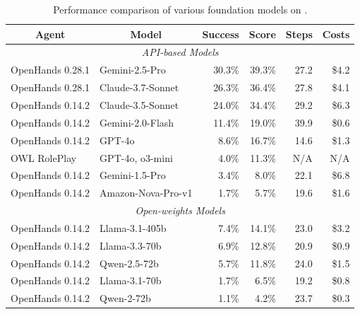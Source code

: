 \documentclass{article}
\begin{document}
\begin{table}
\centering
\scriptsize
\vspace{-6mm}
\caption{Performance comparison of various foundation models on \tac.}
\label{tab:main_table}
\vspace{-1mm}
\begin{tabular}{l|l|rrrr}
\toprule
\multicolumn{1}{c|}{\bf Agent} & \multicolumn{1}{c|}{\bf Model} & \textbf{Success} & \textbf{Score} & \textbf{Steps} & \textbf{Costs} \\
\midrule
\multicolumn{6}{c}{\textit{API-based Models}} \\
\midrule
OpenHands 0.28.1 & Gemini-2.5-Pro & 30.3\% & 39.3\% & 27.2 & \$4.2 \\
OpenHands 0.28.1 & Claude-3.7-Sonnet & 26.3\% & 36.4\% & 27.8 & \$4.1 \\
OpenHands 0.14.2 & Claude-3.5-Sonnet & 24.0\% & 34.4\% & 29.2 & \$6.3\\
OpenHands 0.14.2 & Gemini-2.0-Flash & 11.4\% & 19.0\% & 39.9 & \$0.6 \\
OpenHands 0.14.2 & GPT-4o &  8.6\% & 16.7\% & 14.6 & \$1.3\\
OWL RolePlay & GPT-4o, o3-mini & 4.0\% & 11.3\% & N/A & N/A \\ 
OpenHands 0.14.2 & Gemini-1.5-Pro  & 3.4\% & 8.0\% & 22.1 & \$6.8 \\
OpenHands 0.14.2 & Amazon-Nova-Pro-v1 & 1.7\% & 5.7\% & 19.6 & \$1.6\\
\midrule
\multicolumn{6}{c}{\textit{Open-weights Models}} \\
\midrule
OpenHands 0.14.2 & Llama-3.1-405b & 7.4\% & 14.1\% & 23.0 & \$3.2 \\
OpenHands 0.14.2 & Llama-3.3-70b & 6.9\% & 12.8\% & 20.9 & \$0.9\\
OpenHands 0.14.2 & Qwen-2.5-72b & 5.7\% & 11.8\% & 24.0 & \$1.5\\
OpenHands 0.14.2 & Llama-3.1-70b & 1.7\% & 6.5\% & 19.2 & \$0.8\\
OpenHands 0.14.2 & Qwen-2-72b & 1.1\% &  4.2\% & 23.7 & \$0.3\\
\bottomrule
\end{tabular}
\end{table}
\end{document}
